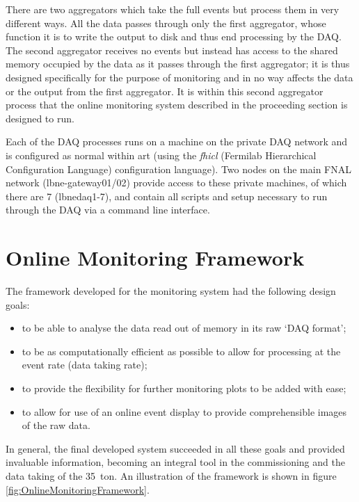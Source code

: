 There are two aggregators which take the full events but process them in very different ways.  All the data passes through only the first aggregator, whose function it is to write the output to disk and thus end processing by the DAQ.  The second aggregator receives no events but instead has access to the shared memory occupied by the data as it passes through the first aggregator; it is thus designed specifically for the purpose of monitoring and in no way affects the data or the output from the first aggregator.  It is within this second aggregator process that the online monitoring system described in the proceeding section is designed to run.

Each of the DAQ processes runs on a machine on the private DAQ network and is configured as normal within art (using the \textit{fhicl} (Fermilab Hierarchical Configuration Language) configuration language).  Two nodes on the main FNAL network (lbne-gateway01/02) provide access to these private machines, of which there are 7 (lbnedaq1-7), and contain all scripts and setup necessary to run through the DAQ via a command line interface.

\section{Online Monitoring Framework}\label{sec:OnlineMonitoring}

The framework developed for the monitoring system had the following design goals:

\begin{itemize}
\item to be able to analyse the data read out of memory in its raw `DAQ format';
\item to be as computationally efficient as possible to allow for processing at the event rate (data taking rate);
\item to provide the flexibility for further monitoring plots to be added with ease;
\item to allow for use of an online event display to provide comprehensible images of the raw data.
\end{itemize}

In general, the final developed system succeeded in all these goals and provided invaluable information, becoming an integral tool in the commissioning and the data taking of the 35~ton.  An illustration of the framework is shown in figure \ref{fig:OnlineMonitoringFramework}.

